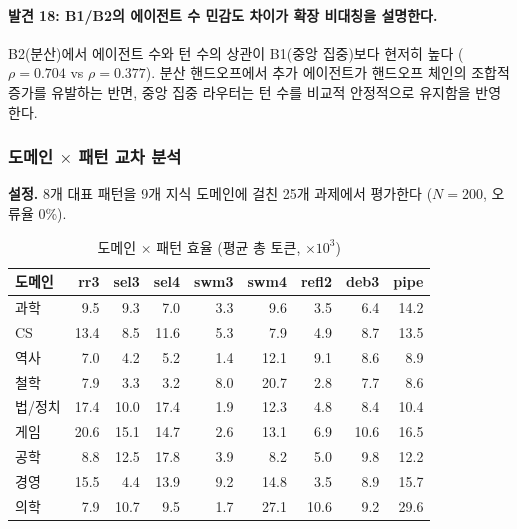 \documentclass[a4paper,11pt]{article}
\begin{document}
\paragraph{발견 18: B1/B2의 에이전트 수 민감도 차이가 확장 비대칭을 설명한다.}
B2(분산)에서 에이전트 수와 턴 수의 상관이 B1(중앙 집중)보다 현저히 높다 ($\rho=0.704$ vs $\rho=0.377$). 분산 핸드오프에서 추가 에이전트가 핸드오프 체인의 조합적 증가를 유발하는 반면, 중앙 집중 라우터는 턴 수를 비교적 안정적으로 유지함을 반영한다.

\subsubsection{도메인 $\times$ 패턴 교차 분석}

\textbf{설정.} 8개 대표 패턴을 9개 지식 도메인에 걸친 25개 과제에서 평가한다 ($N=200$, 오류율 0\%).

\begin{table}[H]
\centering
\caption{도메인 $\times$ 패턴 효율 (평균 총 토큰, $\times 10^{3}$)}
\label{tab:domain-pattern}
{\footnotesize
\begin{tabular}{lrrrrrrrr}
\toprule
도메인 & rr3 & sel3 & sel4 & swm3 & swm4 & refl2 & deb3 & pipe \\
\midrule
과학     & 9.5  & 9.3  & 7.0  & 3.3  & 9.6  & 3.5  & 6.4  & 14.2 \\
CS       & 13.4 & 8.5  & 11.6 & 5.3  & 7.9  & 4.9  & 8.7  & 13.5 \\
역사     & 7.0  & 4.2  & 5.2  & 1.4  & 12.1 & 9.1  & 8.6  & 8.9  \\
철학     & 7.9  & 3.3  & 3.2  & 8.0  & 20.7 & 2.8  & 7.7  & 8.6  \\
법/정치  & 17.4 & 10.0 & 17.4 & 1.9  & 12.3 & 4.8  & 8.4  & 10.4 \\
게임     & 20.6 & 15.1 & 14.7 & 2.6  & 13.1 & 6.9  & 10.6 & 16.5 \\
공학     & 8.8  & 12.5 & 17.8 & 3.9  & 8.2  & 5.0  & 9.8  & 12.2 \\
경영     & 15.5 & 4.4  & 13.9 & 9.2  & 14.8 & 3.5  & 8.9  & 15.7 \\
의학     & 7.9  & 10.7 & 9.5  & 1.7  & 27.1 & 10.6 & 9.2  & 29.6 \\
\bottomrule
\end{tabular}
}
\end{table}
\end{document}

